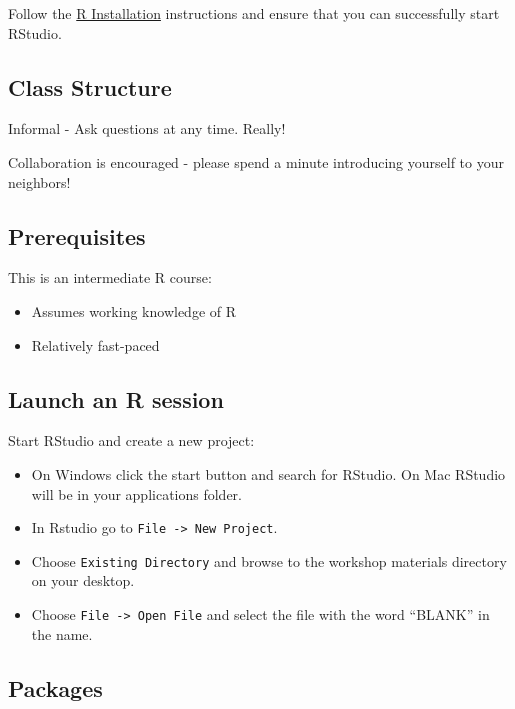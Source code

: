 \documentclass[
]{book}
\providecommand{\tightlist}{%
  \setlength{\itemsep}{0pt}\setlength{\parskip}{0pt}}
\begin{document}
Follow the \href{./Rinstall.html}{R Installation} instructions and ensure that you can successfully start RStudio.

\hypertarget{class-structure-2}{%
\subsection{Class Structure}\label{class-structure-2}}

Informal - Ask questions at any time. Really!

Collaboration is encouraged - please spend a minute introducing yourself to your neighbors!

\hypertarget{prerequisites-2}{%
\subsection{Prerequisites}\label{prerequisites-2}}

This is an intermediate R course:

\begin{itemize}
\tightlist
\item
  Assumes working knowledge of R
\item
  Relatively fast-paced
\end{itemize}

\hypertarget{launch-an-r-session-1}{%
\subsection{Launch an R session}\label{launch-an-r-session-1}}

Start RStudio and create a new project:

\begin{itemize}
\tightlist
\item
  On Windows click the start button and search for RStudio. On Mac
  RStudio will be in your applications folder.
\item
  In Rstudio go to \texttt{File\ -\textgreater{}\ New\ Project}.
\item
  Choose \texttt{Existing\ Directory} and browse to the workshop materials directory on your desktop.
\item
  Choose \texttt{File\ -\textgreater{}\ Open\ File} and select the file with the word ``BLANK'' in the name.
\end{itemize}

\hypertarget{packages-1}{%
\subsection{Packages}\label{packages-1}}
\end{document}
